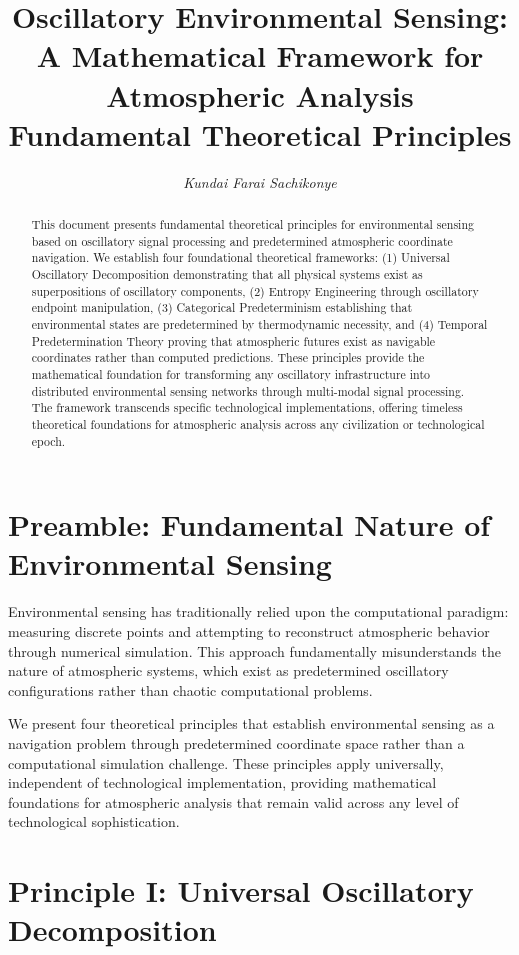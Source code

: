 \documentclass[12pt,a4paper]{article}
\title{
\textbf{Oscillatory Environmental Sensing:\\
A Mathematical Framework for Atmospheric Analysis}\\
\vspace{0.5cm}
\large{Fundamental Theoretical Principles}
}
\author{
\textit{Kundai Farai Sachikonye}
}
\date{}
\begin{document}
\maketitle

\begin{abstract}
This document presents fundamental theoretical principles for environmental sensing based on oscillatory signal processing and predetermined atmospheric coordinate navigation. We establish four foundational theoretical frameworks: (1) Universal Oscillatory Decomposition demonstrating that all physical systems exist as superpositions of oscillatory components, (2) Entropy Engineering through oscillatory endpoint manipulation, (3) Categorical Predeterminism establishing that environmental states are predetermined by thermodynamic necessity, and (4) Temporal Predetermination Theory proving that atmospheric futures exist as navigable coordinates rather than computed predictions. These principles provide the mathematical foundation for transforming any oscillatory infrastructure into distributed environmental sensing networks through multi-modal signal processing. The framework transcends specific technological implementations, offering timeless theoretical foundations for atmospheric analysis across any civilization or technological epoch.
\end{abstract}

\section{Preamble: Fundamental Nature of Environmental Sensing}

Environmental sensing has traditionally relied upon the computational paradigm: measuring discrete points and attempting to reconstruct atmospheric behavior through numerical simulation. This approach fundamentally misunderstands the nature of atmospheric systems, which exist as predetermined oscillatory configurations rather than chaotic computational problems.

We present four theoretical principles that establish environmental sensing as a navigation problem through predetermined coordinate space rather than a computational simulation challenge. These principles apply universally, independent of technological implementation, providing mathematical foundations for atmospheric analysis that remain valid across any level of technological sophistication.

\section{Principle I: Universal Oscillatory Decomposition}
\end{document}
